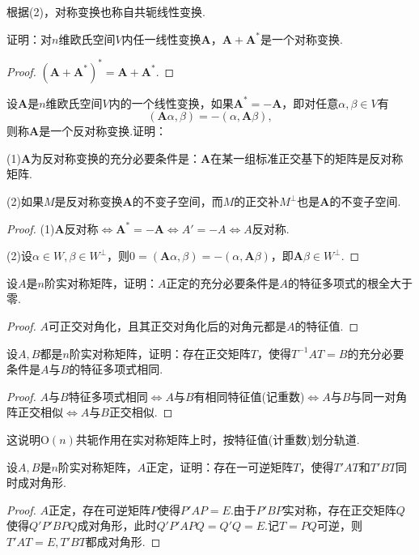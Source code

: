 \begin{note}
	根据(2)，对称变换也称自共轭线性变换.
\end{note}
\begin{prob}[12]
	证明：对$n$维欧氏空间$V$内任一线性变换$\bm A$，$\bm A+\bm A^*$是一个对称变换.
\end{prob}
\begin{proof}
	$(\bm A+\bm A^*)^*=\bm A+\bm A^*$.
\end{proof}
\begin{prob}[13]
	设$\bm A$是$n$维欧氏空间$V$内的一个线性变换，如果$\bm A^*=-\bm A$，即对任意$\alpha,\beta\in V$有
	\[
		(\bm A\alpha,\beta)=-(\alpha,\bm A\beta),
	\]
	则称$\bm A$是一个{\heiti 反对称变换}.证明：

	(1)$\bm A$为反对称变换的充分必要条件是：$\bm A$在某一组标准正交基下的矩阵是反对称矩阵.

	(2)如果$M$是反对称变换$\bm A$的不变子空间，而$M$的正交补$M^\perp$也是$\bm A$的不变子空间.
\end{prob}
\begin{proof}
	(1)$\bm A$反对称$\Leftrightarrow\bm A^*=-\bm A\Leftrightarrow A'=-A\Leftrightarrow A$反对称.

	(2)设$\alpha\in W,\beta\in W^\perp$，则$0=(\bm A\alpha,\beta)=-(\alpha,\bm A\beta)$，即$\bm A\beta\in W^\perp$.
\end{proof}
\begin{prob}[16]
	设$A$是$n$阶实对称矩阵，证明：$A$正定的充分必要条件是$A$的特征多项式的根全大于零.
\end{prob}
\begin{proof}
	$A$可正交对角化，且其正交对角化后的对角元都是$A$的特征值.
\end{proof}
\begin{prob}[17]
	设$A,B$都是$n$阶实对称矩阵，证明：存在正交矩阵$T$，使得$T^{-1}AT=B$的充分必要条件是$A$与$B$的特征多项式相同.
\end{prob}
\begin{proof}
	$A$与$B$特征多项式相同$\Leftrightarrow$$A$与$B$有相同特征值(记重数)$\Leftrightarrow$$A$与$B$与同一对角阵正交相似$\Leftrightarrow$$A$与$B$正交相似.
\end{proof}
\begin{note}
	这说明$\mathrm{O}(n)$共轭作用在实对称矩阵上时，按特征值(计重数)划分轨道.
\end{note}
\begin{prob}[18]
	设$A,B$是$n$阶实对称矩阵，$A$正定，证明：存在一可逆矩阵$T$，使得$T'AT$和$T'BT$同时成对角形.
\end{prob}
\begin{proof}
	$A$正定，存在可逆矩阵$P$使得$P'AP=E$.由于$P'BP$实对称，存在正交矩阵$Q$使得$Q'P'BPQ$成对角形，此时$Q'P'APQ=Q'Q=E$.记$T=PQ$可逆，则$T'AT=E,T'BT$都成对角形.
\end{proof}
